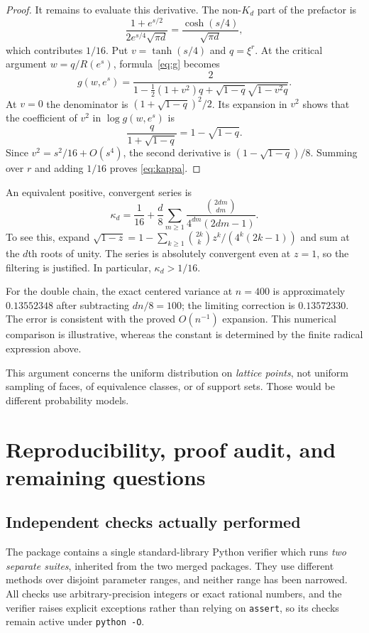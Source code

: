 \documentclass[11pt]{article}
\numberwithin{equation}{section}
\theoremstyle{definition}
\begin{document}
\begin{proof}
It remains to evaluate this derivative. The non-$K_d$ part of the prefactor is
\[
 \frac{1+e^{s/2}}{2e^{s/4}\sqrt{\pi d}}
 =\frac{\cosh(s/4)}{\sqrt{\pi d}},
\]
which contributes $1/16$. Put $v=\tanh(s/4)$ and $q=\xi^r$. At the critical
argument $w=q/R(e^s)$, formula~\eqref{eq:g} becomes
\begin{equation}
 g(w,e^s)=
 \frac{2}{1-\tfrac12(1+v^2)q+\sqrt{1-q}\sqrt{1-v^2q}}.
 \label{eq:criticalfactor}
\end{equation}
At $v=0$ the denominator is
$(1+\sqrt{1-q})^2/2$. Its expansion in $v^2$ shows that the coefficient
of $v^2$ in $\log g(w,e^s)$ is
\[
 \frac{q}{1+\sqrt{1-q}}=1-\sqrt{1-q}.
\]
Since $v^2=s^2/16+O(s^4)$, the second derivative is
$(1-\sqrt{1-q})/8$. Summing over $r$ and adding $1/16$ proves
\eqref{eq:kappa}.
\end{proof}

An equivalent positive, convergent series is
\begin{equation}
 \kappa_d=\frac1{16}+\frac d8
       \sum_{m\geq1}\frac{\binom{2dm}{dm}}{4^{dm}(2dm-1)}.
 \label{eq:kappaseries}
\end{equation}
To see this, expand
$\sqrt{1-z}=1-\sum_{k\geq1}\binom{2k}{k}z^k/(4^k(2k-1))$
and sum at the $d$th roots of unity. The series is absolutely convergent even
at $z=1$, so the filtering is justified. In particular, $\kappa_d>1/16$.

For the double chain, the exact centered variance at $n=400$ is
approximately $0.13552348$ after subtracting $dn/8=100$; the limiting
correction is $0.13572330$. The error is consistent with the proved
$O(n^{-1})$ expansion. This numerical comparison is illustrative, whereas
the constant is determined by the finite radical expression above.

This argument concerns the uniform distribution on \emph{lattice points}, not
uniform sampling of faces, of equivalence classes, or of support sets. Those
would be different probability models.

\section{Reproducibility, proof audit, and remaining questions}
\label{sec:verification}

\subsection{Independent checks actually performed}
\label{sec:checks}
The package contains a single standard-library Python verifier which runs
\emph{two separate suites}, inherited from the two merged packages. They use
different methods over disjoint parameter ranges, and neither range has been
narrowed. All checks use arbitrary-precision integers or exact rational
numbers, and the verifier raises explicit exceptions rather than relying on
\texttt{assert}, so its checks remain active under \texttt{python -O}.
\end{document}
